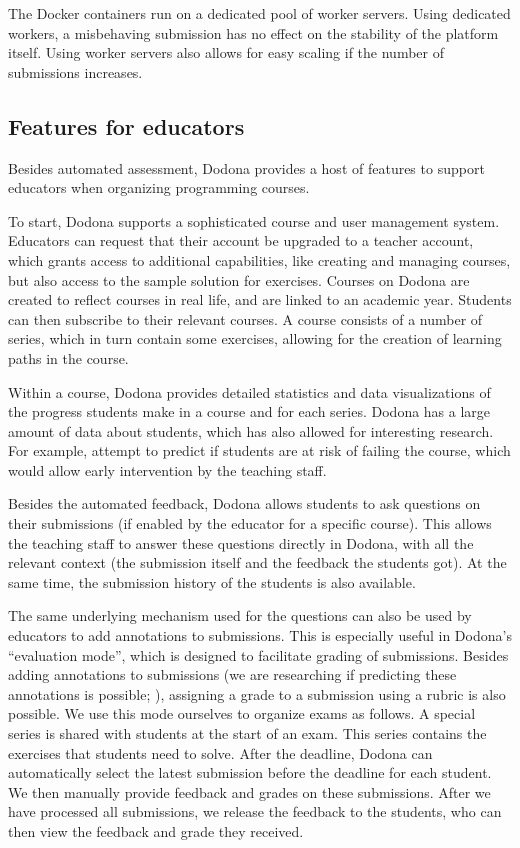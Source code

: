 \documentclass[../main]{subfiles}
\begin{document}
The Docker containers run on a dedicated pool of worker servers.
Using dedicated workers, a misbehaving submission has no effect on the stability of the platform itself.
Using worker servers also allows for easy scaling if the number of submissions increases.

\subsection{Features for educators}\label{subsec:features-for-educators}

Besides automated assessment, Dodona provides a host of features to support educators when organizing programming courses.

To start, Dodona supports a sophisticated course and user management system.
Educators can request that their account be upgraded to a teacher account, which grants access to additional capabilities, like creating and managing courses, but also access to the sample solution for exercises.
Courses on Dodona are created to reflect courses in real life, and are linked to an academic year.
Students can then subscribe to their relevant courses.
A course consists of a number of series, which in turn contain some exercises, allowing for the creation of learning paths in the course.

Within a course, Dodona provides detailed statistics and data visualizations of the progress students make in a course and for each series.
Dodona has a large amount of data about students, which has also allowed for interesting research.
For example, \textcite{vanpetegemPassFailPrediction2023} attempt to predict if students are at risk of failing the course, which would allow early intervention by the teaching staff.

Besides the automated feedback, Dodona allows students to ask questions on their submissions (if enabled by the educator for a specific course).
This allows the teaching staff to answer these questions directly in Dodona, with all the relevant context (the submission itself and the feedback the students got).
At the same time, the submission history of the students is also available.

The same underlying mechanism used for the questions can also be used by educators to add annotations to submissions.
This is especially useful in Dodona's ``evaluation mode'', which is designed to facilitate grading of submissions.
Besides adding annotations to submissions (we are researching if predicting these annotations is possible; \cite{vanpetegemMiningPatternsSyntax2024}), assigning a grade to a submission using a rubric is also possible.
We use this mode ourselves to organize exams as follows.
A special series is shared with students at the start of an exam.
This series contains the exercises that students need to solve.
After the deadline, Dodona can automatically select the latest submission before the deadline for each student.
We then manually provide feedback and grades on these submissions.
After we have processed all submissions, we release the feedback to the students, who can then view the feedback and grade they received.
\end{document}
